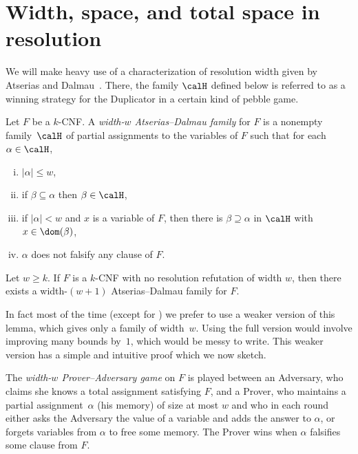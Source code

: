 %
\section{Width, space, and total space in resolution}
%
\label{sec:totalspace}

We will make heavy use of a characterization of resolution width
given by Atserias and Dalmau~\cite{DBLP:journals/jcss/AtseriasD08}.  
There, the family $\calH$ defined below
is referred to as a winning strategy for the Duplicator in a certain kind of pebble game.

\begin{definition} \label{def:AD_family}
Let $F$ be a $k$-CNF. A \emph{width-$w$ Atserias--Dalmau family} for $F$ 
is a nonempty family~$\calH$ of partial assignments to the variables of $F$ such that
for each $\alpha \in \calH$,
\begin{enumerate}[(i)]
\item 
$|\alpha| \le w$,
\item 
if  $\beta \subseteq \alpha$ then $\beta \in \calH$,
\item 
if $|\alpha|< w$ and $x$ is a variable of $F$, then there is 
$\beta \supseteq \alpha$ in $\calH$ with $x \in \dom(\beta)$,
\item\label{def-item:ad-soundness} 
$\alpha$ does not falsify any clause of $F$.
\end{enumerate}
\end{definition}

\begin{lemma}
\label{lem:atserias--dalmau}
Let $w \ge k$. If $F$ is a $k$-CNF with no resolution refutation of width $w$, then there exists
a width-$(w+1)$ Atserias--Dalmau family for $F$.
\end{lemma}

In fact most of the time (except for 
) we prefer to use
a weaker version of this lemma, which gives only
a family of width~$w$. Using the full version 
would involve improving many bounds by~$1$, which would
be messy to  write. 
This weaker version has a simple and intuitive proof which
we now sketch.

The \emph{width-$w$ Prover--Adversary game} on $F$
is played between an Adversary,
who claims she knows a  total assignment satisfying $F$, and 
a Prover, who maintains a partial assignment~$\alpha$ (his memory)
of size at most $w$
and who in each round either asks the Adversary the value of a variable
and adds the answer to $\alpha$, or forgets variables from $\alpha$
to free some memory. 
The Prover wins when $\alpha$ falsifies some clause from $F$.

